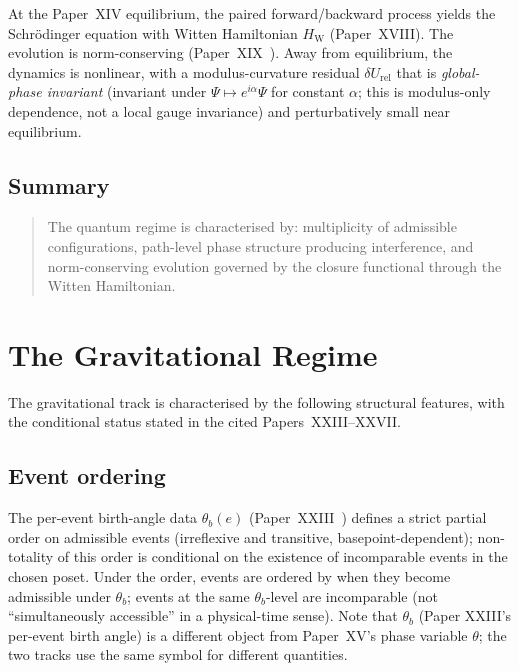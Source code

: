 \documentclass[12pt]{article}
\newcommand{\HW}{H_{\mathrm{W}}}
\begin{document}
At the Paper~XIV equilibrium, the paired forward/backward process yields the Schr\"odinger equation with Witten Hamiltonian $\HW$ (Paper~XVIII). The evolution is norm-conserving (Paper~XIX~\citep{SmartXIX}). Away from equilibrium, the dynamics is nonlinear, with a modulus-curvature residual $\delta U_{\mathrm{rel}}$ that is \emph{global-phase invariant} (invariant under $\Psi \mapsto e^{i\alpha}\Psi$ for constant $\alpha$; this is modulus-only dependence, not a local gauge invariance) and perturbatively small near equilibrium.

\subsection{Summary}

\begin{quote}
The quantum regime is characterised by: multiplicity of admissible configurations, path-level phase structure producing interference, and norm-conserving evolution governed by the closure functional through the Witten Hamiltonian.
\end{quote}

\section{The Gravitational Regime}\label{sec:gravitational}

The gravitational track is characterised by the following structural features, with the conditional status stated in the cited Papers~XXIII--XXVII.

\subsection{Event ordering}

The per-event birth-angle data $\theta_b(e)$ (Paper~XXIII~\citep{SmartXXIII}) defines a strict partial order on admissible events (irreflexive and transitive, basepoint-dependent); non-totality of this order is conditional on the existence of incomparable events in the chosen poset. Under the order, events are ordered by when they become admissible under $\theta_b$; events at the same $\theta_b$-level are incomparable (not ``simultaneously accessible'' in a physical-time sense). Note that $\theta_b$ (Paper XXIII's per-event birth angle) is a different object from Paper~XV's phase variable $\theta$; the two tracks use the same symbol for different quantities.
\end{document}
